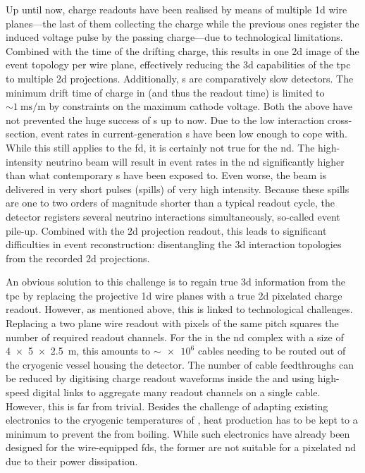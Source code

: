 Up until now, \lartpc{} charge readouts have been realised by means of multiple \gls{1d} wire planes---the last of them collecting the charge while the previous ones register the induced voltage pulse by the passing charge---due to technological limitations.
Combined with the time of the drifting charge, this results in one \gls{2d} image of the event topology per wire plane, effectively reducing the \gls{3d} capabilities of the \gls{tpc} to multiple \gls{2d} projections.
Additionally, \lartpc{}s are comparatively slow detectors.
The minimum drift time of charge in \lar{} (and thus the readout time) is limited to $\sim{\SI{1}{\milli\second\per\metre}}$ by constraints on the maximum cathode voltage.
Both the above have not prevented the huge success of \lartpc{}s up to now.
Due to the low interaction cross-section, event rates in current-generation \lartpc{}s have been low enough to cope with.
While this still applies to the \dune{} \gls{fd}, it is certainly not true for the \gls{nd}.
The high-intensity neutrino beam will result in event rates in the \gls{nd} significantly higher than what contemporary \lartpc{}s have been exposed to.
Even worse, the beam is delivered in very short pulses (spills) of very high intensity.
Because these spills are one to two orders of magnitude shorter than a typical \lartpc{} readout cycle, the detector registers several neutrino interactions simultaneously, so-called event pile-up.
Combined with the \gls{2d} projection readout, this leads to significant difficulties in event reconstruction: disentangling the \gls{3d} interaction topologies from the recorded \gls{2d} projections.

An obvious solution to this challenge is to regain true \gls{3d} information from the \gls{tpc} by replacing the projective \gls{1d} wire planes with a true \gls{2d} pixelated charge readout.
However, as mentioned above, this is linked to technological challenges.
Replacing a two plane wire readout with pixels of the same pitch squares the number of required readout channels.
For the \lartpc{} in the \dune{} \gls{nd} complex with a size of \SI{4 x 5 x 2.5}{\metre}, this amounts to $\sim{\num{e6}}$ cables needing to be routed out of the cryogenic vessel housing the detector.
The number of cable feedthroughs can be reduced by digitising charge readout waveforms inside the \lar{} and using high-speed digital links to aggregate many readout channels on a single cable.
However, this is far from trivial.
Besides the challenge of adapting existing electronics to the cryogenic temperatures of \lar{}, heat production has to be kept to a minimum to prevent the \lar{} from boiling.
While such electronics have already been designed for the wire-equipped \glspl{fd}, the former are not suitable for a pixelated \gls{nd} due to their power dissipation.


